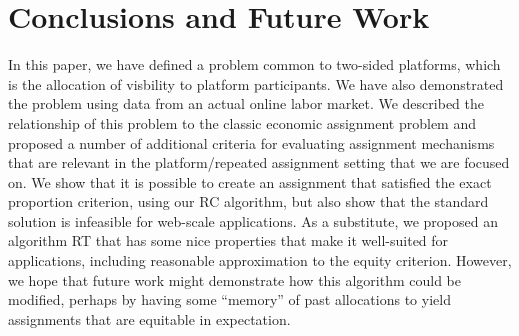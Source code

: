 \section{Conclusions and Future Work} 

In this paper, we have defined a problem common to two-sided
platforms, which is the allocation of visbility to platform
participants. We have also demonstrated the problem using data from an
actual online labor market. We described the relationship of this
problem to the classic economic assignment problem and proposed a
number of additional criteria for evaluating assignment mechanisms that
are relevant in the platform/repeated assignment setting that we are
focused on. We show that it is possible to create an assignment that
satisfied the exact proportion criterion, using our RC
algorithm, but also show that the standard solution is infeasible for
web-scale applications.  As a substitute, we proposed an algorithm RT
that has some nice properties that make it well-suited for
applications, including reasonable approximation to the equity
criterion. However, we hope that future work might demonstrate how
this algorithm could be modified, perhaps by having some ``memory'' of
past allocations to yield assignments that are equitable in
expectation.

